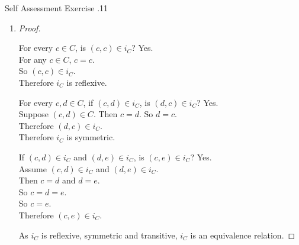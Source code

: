 \documentclass[../notes.tex]{subfiles}
\begin{document}
\begin{exercise}{Self Assessment Exercise \thechapter.11}
\begin{enumerate}
\begin{enumerate}
\begin{proof}
									As $i_{C}$ is both injective and surjective, $i_{C}$ is bijective.
								\end{proof}
							\item {}
								\begin{proof}
									\begin{subproof}[Reflexivity]
										For every $c \in C$, is $(c, c) \in i_{C}$? Yes.\\
										For any $c \in C$, $c = c$.\\
										So $(c, c) \in i_{C}$.\\
										Therefore $i_{C}$ is reflexive.
									\end{subproof}
									\begin{subproof}[Symmetry]
										For every $c, d \in C$, if $(c, d) \in i_{C}$, is $(d, c) \in i_{C}$? Yes.\\
										Suppose $(c, d) \in C$. Then $c = d$. So $d = c$.\\
										Therefore $(d, c) \in i_{C}$.\\
										Therefore $i_{C}$ is symmetric.
									\end{subproof}
									\begin{subproof}[Transitivity]
										If $(c, d) \in i_{C}$ and $(d, e) \in i_{C}$, is $(c, e) \in i_{C}$? Yes.\\
										Assume $(c, d) \in i_{C}$ and $(d, e) \in i_{C}$.\\
										Then $c = d$ and $d = e$.\\
										So $c = d = e$.\\
										So $c = e$.\\
										Therefore $(c, e) \in i_{C}$.
									\end{subproof}
									As $i_{C}$ is reflexive, symmetric and transitive, $i_{C}$ is an equivalence relation.
								\end{proof}
						\end{enumerate}
				\end{enumerate}
			\end{exercise}
\end{document}
